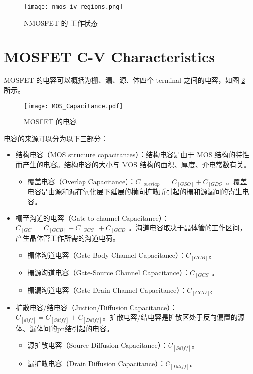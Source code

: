 \begin{figure}[!hbt]
    \centering
    \texttt{[image: nmos\_iv\_regions.png]}
    \caption{NMOSFET 的 工作状态}
    \label{fig:nmos_iv_regions}
\end{figure}

\section{MOSFET C-V Characteristics}

MOSFET 的电容可以概括为栅、漏、源、体四个 terminal 之间的电容，如图 \ref{fig:mosfet_capacitance} 所示。

\begin{figure}[!htb]
    \centering
    \texttt{[image: MOS\_Capacitance.pdf]}
    \caption{MOSFET 的电容\cite{CMOS-VLSI}}
    \label{fig:mosfet_capacitance}
\end{figure}

电容的来源可以分为以下三部分：
\begin{itemize}
    \item 结构电容（MOS structure capacitances）：结构电容是由于 MOS 结构的特性而产生的电容。结构电容的大小与 MOS 结构的面积、厚度、介电常数有关。
    \begin{itemize}
        \item 覆盖电容（Overlap Capacitance）：$C_[overlap] = C_[GSO] + C_[GDO]$。覆盖电容是由源和漏在氧化层下延展的横向扩散所引起的栅和源漏间的寄生电容。
    \end{itemize}
    \item 栅至沟道的电容（Gate-to-channel Capacitance）：$C_[GC] = C_[GCB] + C_[GCS] + C_[GCD]$。沟道电容取决于晶体管的工作区间，产生晶体管工作所需的沟道电荷。
    \begin{itemize}
        \item 栅体沟道电容（Gate-Body Channel Capacitance）：$C_[GCB]$。
        \item 栅源沟道电容（Gate-Source Channel Capacitance）：$C_[GCS]$。
        \item 栅漏沟道电容（Gate-Drain Channel Capacitance）：$C_[GCD]$。
    \end{itemize}
    \item 扩散电容/结电容（Juction/Diffusion Capacitance）：$C_[diff] = C_[Sdiff] + C_[Ddiff]$。扩散电容/结电容是扩散区处于反向偏置的源体、漏体间的pn结引起的电容。
    \begin{itemize}
        \item 源扩散电容（Source Diffusion Capacitance）：$C_[Sdiff]$。
        \item 漏扩散电容（Drain Diffusion Capacitance）：$C_[Ddiff]$。
    \end{itemize}
\end{itemize}

